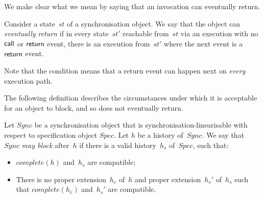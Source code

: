 We make clear what we mean by saying that an invocation can eventually return.
%
\begin{definition}
Consider a state~$st$ of a synchronisation object.  We say that the object can
\emph{eventually return} if in every state~$st'$ reachable from~$st$ via an
execution with no $\mathsf{call}$ or $\mathsf{return}$ event, there is an execution from~$st'$
where the next event is a $\mathsf{return}$ event.
\end{definition}
%
Note that the condition means that a return event can happen next on
\emph{every} execution path.






The following definition describes the circumstances under which it is
acceptable for an object to block, and so does not eventually return.
%
\begin{definition}
Let $Sync$ be a synchronisation object that is synchronisation-linearisable
with respect to specification object $Spec$.  Let $h$ be a history of~$Sync$.
We say that $Sync$ \emph{may block} after~$h$ if there is
a valid history~$h_s$ of~$Spec$, such that:
%
\begin{itemize}
\item $complete(h)$ and~$h_s$ are compatible;


\item There is no proper extension~$h_e$ of~$h$ and proper extension~$h_s'$
  of~$h_s$ such that $complete(h_e)$ and~$h_s'$ are compatible. 
\end{itemize}
\end{definition}

